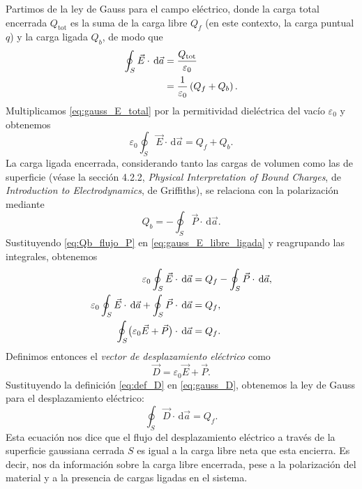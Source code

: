 \documentclass[11pt]{article}
\newcommand{\dd}{\,\mathrm d}
\begin{document}
Partimos de la ley de Gauss para el campo eléctrico, donde la
carga total encerrada $Q_{\mathrm{tot}}$ es la suma de la carga
libre $Q_f$ (en este contexto, la carga puntual $q$) y la carga
ligada $Q_b$, de modo que
\begin{align}
  \oint_S\vec E\cdot\dd\vec a
    &=\frac{Q_{\mathrm{tot}}}{\varepsilon_0}
      \notag\\
    &=\frac{1}{\varepsilon_0}\left(Q_f+Q_b\right).
      \label{eq:gauss_E_total}
\end{align}
Multiplicamos \eqref{eq:gauss_E_total} por la permitividad
dieléctrica del vacío $\varepsilon_0$ y obtenemos
\begin{equation}
  \varepsilon_0\oint_S\vec E\cdot\dd\vec a=Q_f+Q_b.
  \label{eq:gauss_E_libre_ligada}
\end{equation}
La carga ligada encerrada, considerando tanto las cargas de volumen
como las de superficie (véase la sección 4.2.2,
\emph{Physical Interpretation of Bound Charges}, de
\emph{Introduction to Electrodynamics}, de Griffiths), se relaciona
con la polarización mediante
\begin{equation}
  Q_b=-\oint_S\vec P\cdot\dd\vec a.
  \label{eq:Qb_flujo_P}
\end{equation}
Sustituyendo \eqref{eq:Qb_flujo_P} en
\eqref{eq:gauss_E_libre_ligada} y reagrupando las integrales,
obtenemos
\begin{align}
  \varepsilon_0\oint_S\vec E\cdot\dd\vec a
    &=Q_f-\oint_S\vec P\cdot\dd\vec a,
      \notag\\
  \varepsilon_0\oint_S\vec E\cdot\dd\vec a
    +\oint_S\vec P\cdot\dd\vec a
    &=Q_f,
      \notag\\
  \oint_S
    \bigl(\varepsilon_0\vec E+\vec P\bigr)
    \cdot\dd\vec a
    &=Q_f.
      \label{eq:gauss_D}
\end{align}
Definimos entonces el \emph{vector de desplazamiento eléctrico} como
\begin{equation}
  \vec D=\varepsilon_0\vec E+\vec P.
  \label{eq:def_D}
\end{equation}
Sustituyendo la definición \eqref{eq:def_D} en
\eqref{eq:gauss_D}, obtenemos la ley de Gauss para
el desplazamiento eléctrico:
\begin{equation}
  \oint_S\vec D\cdot\dd\vec a=Q_f.
  \label{eq:gauss_D_integral}
\end{equation}
Esta ecuación nos dice que el flujo del desplazamiento eléctrico
a través de la superficie gaussiana cerrada $S$ es igual a la
carga libre neta que esta encierra. Es decir, nos da información
sobre la carga libre encerrada, pese a la polarización del material
y a la presencia de cargas ligadas en el sistema.
\end{document}
